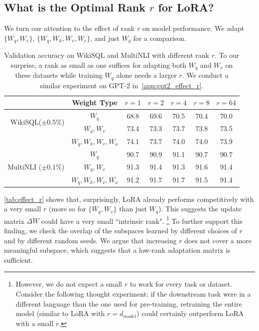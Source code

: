 \documentclass{article} %
\begin{document}
\subsection{What is the Optimal Rank $r$ for LoRA?}
\label{sec:effect_of_r}

We turn our attention to the effect of rank $r$ on model performance.
We adapt $\{W_q, W_v\}$, $\{W_q, W_k, W_v, W_c\}$, and just $W_q$ for a comparison.



\begin{table}[h]
  \centering
  \begin{tabular}{r|c|ccccc}
  \hline
  \toprule
                                        & Weight Type           & $r=1$  & $r=2$  & $r=4$  & $r=8$  & $r=64$  \\
  \midrule
  \multirow{2}{*}{WikiSQL($\pm0.5$\%)}  & $W_{q}$               & 68.8   & 69.6   & 70.5   & 70.4   & 70.0    \\
                                        & $W_q, W_v$            & 73.4   & 73.3   & 73.7   & 73.8   & 73.5    \\
                                        & $W_q, W_k, W_v, W_o$  & 74.1   & 73.7   & 74.0   & 74.0   & 73.9    \\
  \midrule
  \multirow{3}{*}{MultiNLI ($\pm0.1$\%)}& $W_q$                 & 90.7   & 90.9   & 91.1   & 90.7   & 90.7    \\ 
                                        & $W_q, W_v$            & 91.3   & 91.4   & 91.3   & 91.6   & 91.4    \\ 
                                        & $W_q, W_k, W_v, W_o$  & 91.2   & 91.7   & 91.7   & 91.5   & 91.4    \\
  
  \bottomrule
  \end{tabular}
  \caption{Validation accuracy on WikiSQL and MultiNLI with different rank $r$. To our surprise, a rank as small as one suffices for adapting both $W_q$ and $W_v$ on these datasets while training $W_q$ alone needs a larger $r$. We conduct a similar experiment on GPT-2 in~\autoref{app:gpt2_effect_r}.}
  \label{tab:effect_r}
\end{table}

\autoref{tab:effect_r} shows that, surprisingly, LoRA already performs competitively with a very small $r$ (more so for $\{W_q, W_v\}$ than just $W_q$).
This suggests the update matrix $\Delta W$ could have a very small ``intrinsic rank".%
\footnote{However, we do not expect a small $r$ to work for every task or dataset.
Consider the following thought experiment: if the downstream task were in a different language than the one used for pre-training, retraining the entire model (similar to LoRA with $r=d_{model}$) could certainly outperform LoRA with a small $r$.}
To further support this finding, we check the overlap of the subspaces learned by different choices of $r$ and by different random seeds. We argue that increasing $r$ does not cover a more meaningful subspace, which suggests that a low-rank adaptation matrix is sufficient.
\end{document}
